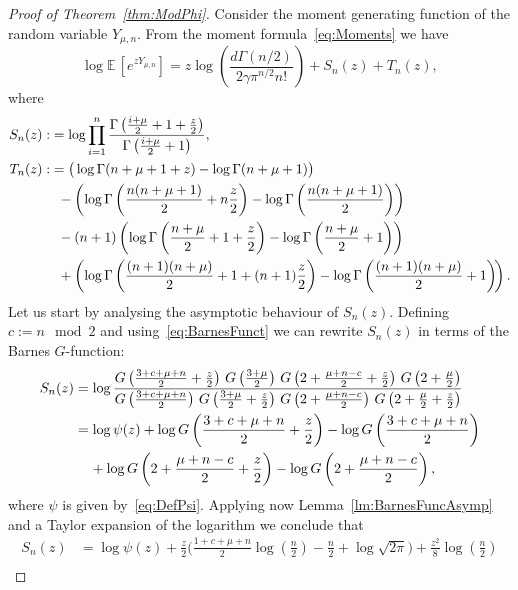 \documentclass[AHL,Unicode,longabstracts,published]{cedram}
\newcommand{\EE}{\mathbb{E}\,}
\begin{document}
\begin{proof}[Proof of Theorem~\ref{thm:ModPhi}]
Consider the moment generating function of the random variable $Y_{\mu,n}$. From the moment formula~\eqref{eq:Moments} we have
\begin{equation}\label{eq:MomentGenartingFct}
\log \EE \left[e^{zY_{\mu,n}}\right] =z\log\left(\frac{d\Gamma(n/2)}{2\gamma\pi^{n/2}n!}\right)+S_n(z)+T_n(z),
\end{equation}
where
\begin{align*}
S_n(z):&=\log \prod\limits_{i=1}^n\frac{\Gamma\left(\frac{i+\mu}{2}+1+\frac{z}{2}\right)}{\Gamma\left(\frac{i+\mu}{2}+1\right)},\\
T_n(z):&=\big(\log\Gamma(n+\mu+1+z)-\log\Gamma(n+\mu+1)\big)\\
&\mkern10mu-\left(\log\Gamma\left(\frac{n(n+\mu+1)}{2}+n\frac{z}{2}\right)-\log\Gamma\left(\frac{n(n+\mu+1)}{2}\right)\right)\\
&\mkern10mu-(n+1)\left(\log \Gamma\left(\frac{n+\mu}{2}+1+\frac{z}{2}\right) -\log\Gamma\left(\frac{n+\mu}{2}+1\right)\right)\\
&\mkern10mu+\left(\log\Gamma\left(\frac{(n+1)(n+\mu)}{2}+1+(n+1)\frac{z}{2}\right)-\log \Gamma\left(\frac{(n+1)(n+\mu)}{2}+1\right)\!\right).
\end{align*}
Let us start by analysing the asymptotic behaviour of $S_n(z)$. Defining $c:= n\mod 2$ and using~\eqref{eq:BarnesFunct} we can rewrite $S_n(z)$ in terms of the Barnes $G$-function:
\begin{align*}
S_n(z)&=\log \frac{G\left(\frac{3+c+\mu+n}{2}+\frac{z}{2}\right)\,G\left(\frac{3+\mu}{2}\right)\,G\left(2+\frac{\mu+n-c}{2}+\frac{z}{2}\right)\,G\left(2+\frac{\mu}{2}\right)}{G\left(\frac{3+c+\mu+n}{2}\right)\,G\left(\frac{3+\mu}{2}+\frac{z}{2}\right)\,G\left(2+\frac{\mu+n-c}{2}\right)\,G\left(2+\frac{\mu}{2}+\frac{z}{2}\right)}\\
&=\log \psi(z)+ \log G\left(\frac{3+c+\mu+n}{2}+\frac{z}{2}\right) - \log G\left(\frac{3+c+\mu+n}{2}\right)\\
&\mkern20mu+\log G\left(2+\frac{\mu+n-c}{2}+\frac{z}{2}\right)-\log G\left(2+\frac{\mu+n-c}{2}\right),
\end{align*}
where $\psi$ is given by~\eqref{eq:DefPsi}. Applying now Lemma~\ref{lm:BarnesFuncAsymp} and a Taylor expansion of the logarithm we conclude that
\begin{align*}
S_n(z)&=\log \psi(z)+ \frac{z}{2}\bigg(\frac{1+c+\mu+n}{2}\log\left(\frac{n}{2}\right)-\frac{n}{2}+\log\sqrt{2\pi}\bigg)+\frac{z^2}{8}\log \left(\frac{n}{2}\right)\\

\end{align*}
\end{proof}
\end{document}
